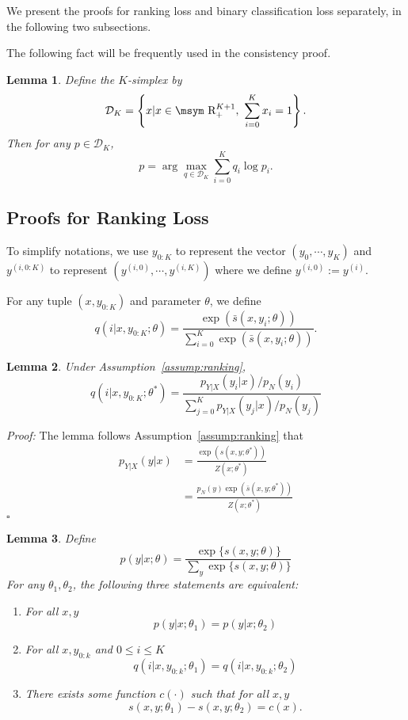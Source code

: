 \documentclass[11pt,a4paper]{article}
\newcommand{\qed}{\square}
\newcommand{\reals}{\mbox{\msym R}}
\newcommand{\str}[3]{s(#1, #2; #3)}
\newcommand{\ssf}[3]{\bar{s}(#1, #2; #3)}
\newtheorem{lemma}{Lemma}[section]
\begin{document}
We present the proofs for ranking loss and binary classification loss separately, in the following two subsections. 

The following fact will be frequently used in the consistency proof. 
\begin{lemma}
Define the $K$-simplex by 
\[
\mathcal{D}_K = \left\{x | x\in\reals_+^{K+1},~ \sum_{i=0}^K x_i =1 \right\}. 
\]
Then for any $p\in\mathcal{D}_K$, 
\[
p = \arg\max_{q\in\mathcal{D}_K} \sum_{i=0}^K q_i\log p_i.
\]
\label{lem:entropy}
\end{lemma}


\subsection{Proofs for Ranking Loss}
\label{sec:proof-ranking}
To simplify notations, we use $y_{0:K}$ to represent the vector $(y_0, \cdots, y_K)$ and $y^{(i, 0:K)}$ to represent $(y^{(i, 0)}, \cdots, y^{(i, K)})$ where we define $y^{(i, 0)}:= y^{(i)}$. 


For any tuple $(x, y_{0:K})$ and parameter $\theta$, we define 
\[
q(i | x, y_{0:K}; \theta)
= \frac{\exp( \ssf{x}{y_i}{\theta})}{\sum_{i=0}^K \exp( \ssf{x}{y_i}{\theta})}.
\]




 


\begin{lemma}
Under Assumption~\ref{assump:ranking}, 
\[
q(i | x, y_{0:K}; \theta^*)
= \frac{p_{Y|X}(y_i|x)/p_N(y_i)}{\sum_{j=0}^K p_{Y|X}(y_j|x)/p_N(y_j)}
\]
\label{lemma:qi}
\end{lemma}

{\em Proof:} The lemma follows Assumption~\ref{assump:ranking} that
\begin{equation*}
\begin{aligned}
p_{Y|X}(y | x) & = \frac{ \exp(\str{x}{y}{\theta^*})}{Z(x; \theta^*)} \\
& = \frac{ p_N(y)\exp(\ssf{x}{y}{\theta^*})}{Z(x; \theta^*)}
\end{aligned}
\end{equation*}
$\qed$



\begin{lemma}
Define 
\[
p(y | x; \theta) = \frac{ \exp \{ \str{x}{y}{\theta} \}} { \sum_y
   \exp \{ \str{x}{y}{\theta} \} } 
\]
For any $\theta_1, \theta_2$, the following three statements are equivalent: 
\begin{enumerate}[label={(\arabic*)}]
  \item  For all $x, y$ 
  \[
  p(y | x; \theta_1) = p(y | x; \theta_2)
  \]
  \item  For all $x, y_{0:k}$ and $0\leq i\leq K$ 
  \[
  q(i | x, y_{0:k}; \theta_1) = q(i | x, y_{0:k}; \theta_2)
  \]
  \item  There exists some function $c(\cdot)$ such  that for all $x, y$
  \[
  \str{x}{y}{\theta_1} - \str{x}{y}{\theta_2} = c(x).
  \]
\end{enumerate}
\label{lem:iden}
\end{lemma}
\end{document}
